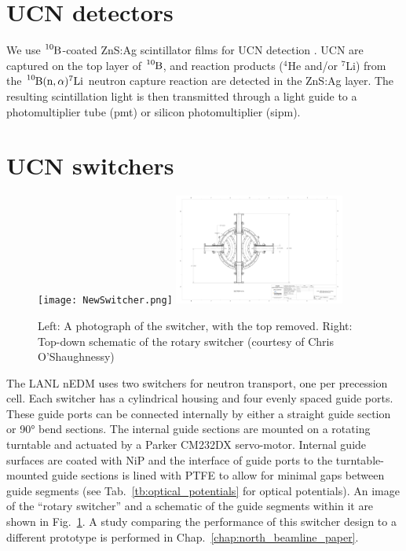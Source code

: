 
\section{UCN detectors}\label{sec:ucn_detectors}


We use $\ce{^{10}B}$-coated ZnS:Ag scintillator films for UCN detection \cite{jeph_b10_2011}. UCN are captured on the top layer of $\ce{^{10}B}$, and reaction products ($^4$He and/or $^7$Li) from the $\ce{^{10}B}(\text{n},\alpha)^7\text{Li}$ neutron capture reaction are detected in the ZnS:Ag layer. The resulting scintillation light is then transmitted through a light guide to a photomultiplier tube (\acrshort*{pmt}) or silicon photomultiplier (\acrshort*{sipm}).


\section{UCN switchers}\label{sec:lanl_switchers}


\begin{figure}
    \centering
    \texttt{[image: NewSwitcher.png]}
    \hspace{1em}
    \includegraphics[width=0.5\textwidth]{figures/switcher_schematic.pdf}
    \caption[Photograph and schematic of rotary switcher]{Left: A photograph of the switcher, with the top removed. Right: Top-down schematic of the rotary switcher (courtesy of Chris O'Shaughnessy) }\label{fig:NewSwitcher}
\end{figure}

The LANL nEDM uses two switchers for neutron transport, one per precession cell. Each switcher has a cylindrical housing and four evenly spaced guide ports. These guide ports can be connected internally by either a straight guide section or \ang{90} bend sections. The internal guide sections are mounted on a rotating turntable and actuated by a Parker CM232DX servo-motor. Internal guide surfaces are coated with NiP and the interface of guide ports to the turntable-mounted guide sections is lined with PTFE to allow for minimal gaps between guide segments (see Tab.~\ref{tb:optical_potentials} for optical potentials). An image of the ``rotary switcher'' and a schematic of the guide segments within it are shown in Fig.~\ref{fig:NewSwitcher}. A study comparing the performance of this switcher design to a different prototype is performed in Chap.~\ref{chap:north_beamline_paper}.

